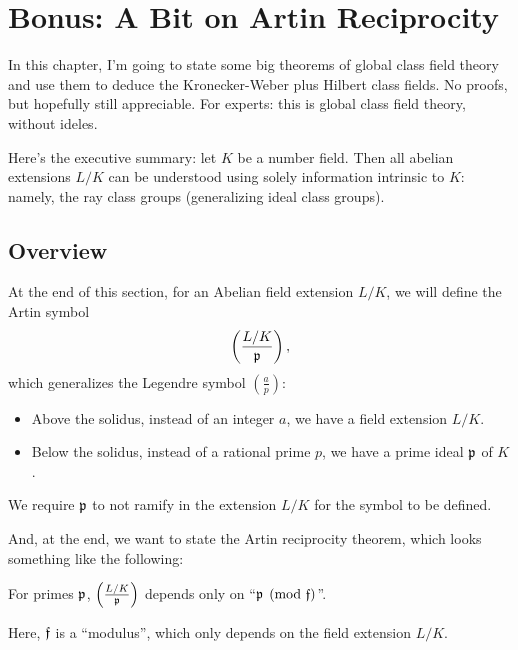 \chapter{Bonus: A Bit on Artin Reciprocity}
\label{ch:artin_reciprocity}
In this chapter, I'm going to state some big theorems of
global class field theory and use them to deduce the
Kronecker-Weber plus Hilbert class fields.
No proofs, but hopefully still appreciable.
For experts: this is global class field theory, without ideles.

Here's the executive summary: let $K$ be a number field.
Then all abelian extensions $L/K$ can be understood
using solely information intrinsic to $K$:
namely, the ray class groups (generalizing ideal class groups).

\section{Overview}

At the end of this section, for an Abelian field extension $L/K$, we will define
the Artin symbol
\[ \left( \frac{L/K}{\mathfrak p} \right), \]
which generalizes the Legendre symbol $\left( \frac{a}{p} \right)$:
\begin{itemize}
	\item Above the solidus, instead of an integer $a$, we have a field
		extension $L/K$.
	\item Below the solidus, instead of a rational prime $p$, we have a prime
		ideal $\mathfrak p$ of $K$.
\end{itemize}

We require $\mathfrak p$ to not ramify in the extension $L/K$ for the symbol to be
defined.

And, at the end, we want to state the Artin reciprocity theorem, which looks
something like the following:
\begin{moral}
	For primes $\mathfrak p$,
	$\left( \frac{L/K}{\mathfrak p} \right)$ depends
	only on ``$\mathfrak p \pmod {\mathfrak f}$''.
\end{moral}

Here, $\mathfrak f$ is a ``modulus'', which only depends on the field extension $L/K$.

